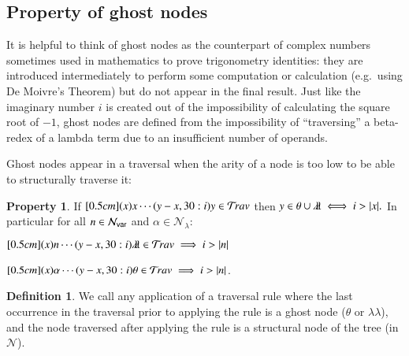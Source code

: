 \documentclass{elsarticle}
\theoremstyle{plain}
\theoremstyle{definition}
\newtheorem{definition}{Definition}[section]
\newtheorem{property}{Property}[section]
\theoremstyle{remark}
\newcommand\Nodes{\mathcal{N}}%
\newcommand\NodesVar{\Nodes_{\sf var}}%
\newcommand\NodesLmd{\Nodes_\lambda}%
\newcommand{\ghostlmd}{{\lambda\!\!\lambda}}
\newcommand{\ghostvar}{\theta}
\newcommand{\travulc}{\travset}
\begin{document}
\subsection{Property of ghost nodes}

It is helpful to think of ghost nodes as the counterpart of complex numbers sometimes used in mathematics
to prove trigonometry identities: they are introduced intermediately to perform some computation or calculation (e.g.\ using De Moivre's Theorem) but do not appear in the final result. Just like the imaginary number $i$ is created out of the impossibility of calculating the square root of $-1$, ghost nodes are defined from the impossibility of ``traversing'' a beta-redex of a lambda term due to an insufficient number of operands.


Ghost nodes appear in a traversal when the arity of a node is too low to be able to structurally traverse it:
\begin{property}
\label{prop:ghost_justifier_arity}
If $\Pstr[0.5cm]{(x){x} \cdots (y-x,30:i){y}} \in \travulc$ then
$ y \in \ghostvar \union \ghostlmd \iff i > |x|.$
In particular for all $n\in\NodesVar$ and $\alpha\in\NodesLmd$:
\begin{enumerate*}[nosep,label=(\roman*)]
\item $\Pstr[0.5cm]{(x){n} \cdots (y-x,30:i){\ghostlmd}} \in \travulc \implies i > |n|$
\item $\Pstr[0.5cm]{(x){\alpha} \cdots (y-x,30:i){\ghostvar}} \in \travulc \implies i > |n|$.
\end{enumerate*}
\end{property}

\begin{definition}
We call  any application of a traversal rule where the last occurrence in the traversal prior to applying the rule is a ghost node ($\ghostvar$ or $\ghostlmd$), and the node traversed after applying the rule is a structural node of the tree (in $\Nodes$).
\end{definition}
\end{document}
